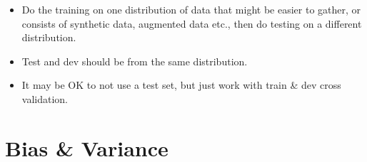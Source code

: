 \begin{itemize}
	\item Do the training on one distribution of data that might be easier to gather, or consists of synthetic data, augmented data etc., then do testing on a different distribution.
	\item Test and dev should be from the same distribution.
    \item It may be OK to not use a test set, but just work with train \& dev cross validation.
\end{itemize}







\section{Bias \& Variance}

